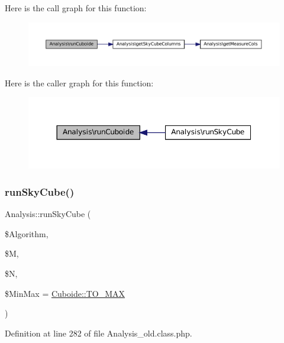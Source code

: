 Here is the call graph for this function\+:\nopagebreak
\begin{figure}[H]
\begin{center}
\leavevmode
\includegraphics[width=350pt]{class_analysis_a9cda19ef90a12fd21523975730dd769d_cgraph}
\end{center}
\end{figure}
Here is the caller graph for this function\+:\nopagebreak
\begin{figure}[H]
\begin{center}
\leavevmode
\includegraphics[width=350pt]{class_analysis_a9cda19ef90a12fd21523975730dd769d_icgraph}
\end{center}
\end{figure}
\mbox{\label{class_analysis_a650bcf73f24eb914df10c9185ca40c67}} 
\subsubsection{\texorpdfstring{run\+Sky\+Cube()}{runSkyCube()}}
{\footnotesize\ttfamily Analysis\+::run\+Sky\+Cube (\begin{DoxyParamCaption}\item[{}]{\$\+Algorithm,  }\item[{}]{\$M,  }\item[{}]{\$N,  }\item[{}]{\$\+Min\+Max = {\ttfamily \hyperlink{class_cuboide_afd49ea48fafb0362d27f78f6f4ef8b84}{Cuboide\+::\+T\+O\+\_\+\+M\+AX}} }\end{DoxyParamCaption})}



Definition at line 282 of file Analysis\+\_\+old.\+class.\+php.



